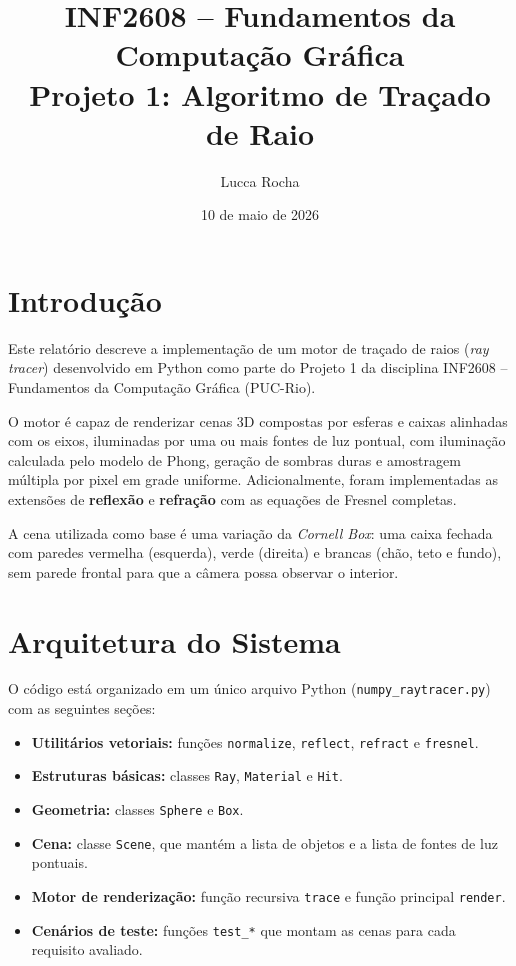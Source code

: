 \documentclass[12pt,a4paper]{article}
\title{
  \textbf{INF2608 -- Fundamentos da Computação Gráfica}\\[0.4em]
  \large Projeto 1: Algoritmo de Traçado de Raio
}
\author{Lucca Rocha}
\date{10 de maio de 2026}
\begin{document}
\maketitle
\tableofcontents
\newpage

\section{Introdução}

Este relatório descreve a implementação de um motor de traçado de raios
(\textit{ray tracer}) desenvolvido em Python como parte do Projeto 1 da
disciplina INF2608 -- Fundamentos da Computação Gráfica (PUC-Rio).

O motor é capaz de renderizar cenas 3D compostas por esferas e caixas
alinhadas com os eixos, iluminadas por uma ou mais fontes de luz pontual,
com iluminação calculada pelo modelo de Phong, geração de sombras duras e
amostragem múltipla por pixel em grade uniforme. Adicionalmente, foram
implementadas as extensões de \textbf{reflexão} e \textbf{refração} com
as equações de Fresnel completas.

A cena utilizada como base é uma variação da \textit{Cornell Box}: uma
caixa fechada com paredes vermelha (esquerda), verde (direita) e brancas
(chão, teto e fundo), sem parede frontal para que a câmera possa observar
o interior.

\section{Arquitetura do Sistema}

O código está organizado em um único arquivo Python
(\texttt{numpy\_raytracer.py}) com as seguintes seções:

\begin{itemize}
  \item \textbf{Utilitários vetoriais:} funções \texttt{normalize},
        \texttt{reflect}, \texttt{refract} e \texttt{fresnel}.
  \item \textbf{Estruturas básicas:} classes \texttt{Ray},
        \texttt{Material} e \texttt{Hit}.
  \item \textbf{Geometria:} classes \texttt{Sphere} e \texttt{Box}.
  \item \textbf{Cena:} classe \texttt{Scene}, que mantém a lista de
        objetos e a lista de fontes de luz pontuais.
  \item \textbf{Motor de renderização:} função recursiva \texttt{trace}
        e função principal \texttt{render}.
  \item \textbf{Cenários de teste:} funções \texttt{test\_*} que montam
        as cenas para cada requisito avaliado.
\end{itemize}
\end{document}

